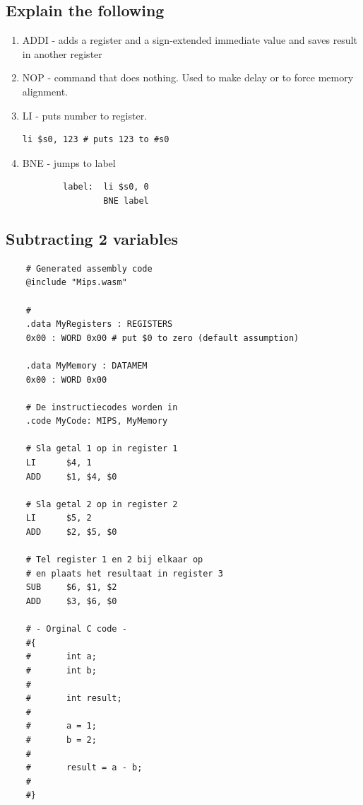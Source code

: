 \documentclass[10pt]{article}
\begin{document}
\subsection{Explain the following}
    \begin{enumerate}
        \item ADDI - adds a register and a sign-extended immediate value and saves result in another register
        \item NOP - command that does nothing. Used to make delay or to force memory alignment.
        \item LI - puts number to register.
        \begin{verbatim}li $s0, 123 # puts 123 to #s0\end{verbatim}
        \item BNE - jumps to label
        \begin{verbatim}
        label:  li $s0, 0
                BNE label
        \end{verbatim}
    \end{enumerate}

\subsection{Subtracting 2 variables}
\begin{verbatim}
    # Generated assembly code
    @include "Mips.wasm"
     
    #
    .data MyRegisters : REGISTERS
    0x00 : WORD 0x00 # put $0 to zero (default assumption)
     
    .data MyMemory : DATAMEM
    0x00 : WORD 0x00
     
    # De instructiecodes worden in
    .code MyCode: MIPS, MyMemory
     
    # Sla getal 1 op in register 1
    LI      $4, 1
    ADD     $1, $4, $0
     
    # Sla getal 2 op in register 2
    LI      $5, 2
    ADD     $2, $5, $0
     
    # Tel register 1 en 2 bij elkaar op
    # en plaats het resultaat in register 3
    SUB     $6, $1, $2
    ADD     $3, $6, $0
     
    # - Orginal C code -
    #{
    #       int a;
    #       int b;
    #
    #       int result;
    #
    #       a = 1;
    #       b = 2;
    #
    #       result = a - b;
    #
    #}

\end{verbatim}
\end{document}
